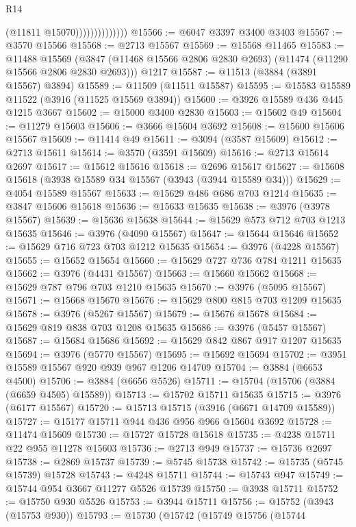 \begin{lexlean}{R14}
\begin{coremodule}
                              (@11811 @15070))))))))))))))
@15566 := @6047 @3397 @3400 @3403
@15567 := @3570 @15566
@15568 := @2713 @15567
@15569 := @15568 @11465
@15583 := @11488
    @15569
    (@3847 (@11468 @15566 @2806 @2830 @2693) (@11474 (@11290 @15566 @2806 @2830 @2693)))
    @1217
@15587 := @11513 (@3884 (@3891 @15567) @3894)
@15589 := @11509 (@11511 @15587)
@15595 := @15583 @15589 @11522 (@3916 (@11525 @15569 @3894))
@15600 := @3926 @15589 @436 @445 @1215 @3667
@15602 := @15000 @3400 @2830
@15603 := @15602 @49
@15604 := @11279 @15603
@15606 := @3666 @15604 @3692
@15608 := @15600 @15606 @15567
@15609 := @11414 @49
@15611 := @3094 (@3587 @15609)
@15612 := @2713 @15611
@15614 := @3570 (@3591 @15609)
@15616 := @2713 @15614 @2697
@15617 := @15612 @15616
@15618 := @2696 @15617
@15627 := @15608 @15618 (@3938 @15589 @34 @15567 (@3943 (@3944 @15589 @34)))
@15629 := @4054 @15589 @15567
@15633 := @15629 @486 @686 @703 @1214
@15635 := @3847 @15606 @15618
@15636 := @15633 @15635
@15638 := @3976 (@3978 @15567)
@15639 := @15636 @15638
@15644 := @15629 @573 @712 @703 @1213 @15635
@15646 := @3976 (@4090 @15567)
@15647 := @15644 @15646
@15652 := @15629 @716 @723 @703 @1212 @15635
@15654 := @3976 (@4228 @15567)
@15655 := @15652 @15654
@15660 := @15629 @727 @736 @784 @1211 @15635
@15662 := @3976 (@4431 @15567)
@15663 := @15660 @15662
@15668 := @15629 @787 @796 @703 @1210 @15635
@15670 := @3976 (@5095 @15567)
@15671 := @15668 @15670
@15676 := @15629 @800 @815 @703 @1209 @15635
@15678 := @3976 (@5267 @15567)
@15679 := @15676 @15678
@15684 := @15629 @819 @838 @703 @1208 @15635
@15686 := @3976 (@5457 @15567)
@15687 := @15684 @15686
@15692 := @15629 @842 @867 @917 @1207 @15635
@15694 := @3976 (@5770 @15567)
@15695 := @15692 @15694
@15702 := @3951 @15589 @15567 @920 @939 @967 @1206 @14709
@15704 := @3884 (@6653 @4500)
@15706 := @3884 (@6656 @5526)
@15711 := @15704 (@15706 (@3884 (@6659 @4505) @15589))
@15713 := @15702 @15711 @15635
@15715 := @3976 (@6177 @15567)
@15720 := @15713 @15715 (@3916 (@6671 @14709 @15589))
@15727 := @15177 @15711 @944 @436 @956 @966 @15604 @3692
@15728 := @11474 @15609
@15730 := @15727 @15728 @15618
@15735 := @4238 @15711 @22 @955 @11278 @15603
@15736 := @2713 @949
@15737 := @15736 @2697
@15738 := @2869 @15737
@15739 := @5745 @15738
@15742 := @15735 (@5745 @15739) @15728
@15743 := @4248 @15711
@15744 := @15743 @947
@15749 := @15744 @954 @3667 @11277 @5526 @15739
@15750 := @3938 @15711
@15752 := @15750 @930 @5526
@15753 := @3944 @15711
@15756 := @15752 (@3943 (@15753 @930))
@15793 := @15730
    (@15742
      (@15749
        @15756
        (@15744

\end{coremodule}
\end{lexlean}
